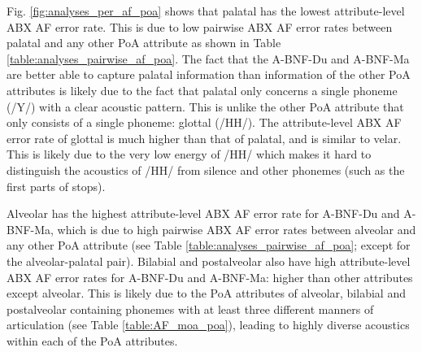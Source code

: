 \documentclass[transmag]{IEEEtran}
\begin{document}
Fig. \ref{fig:analyses_per_af_poa} shows that palatal has the lowest attribute-level ABX AF error rate. This is due to low pairwise ABX AF error rates between palatal and any other PoA attribute as shown in Table   \ref{table:analyses_pairwise_af_poa}. The fact that the A-BNF-Du and A-BNF-Ma are better able to capture palatal information than information of the other PoA attributes is likely due to the fact that palatal only concerns a single phoneme (/Y/) with a clear acoustic pattern. This is unlike the other PoA attribute that only consists of a single phoneme: glottal (/HH/). The attribute-level ABX AF error rate of glottal is much higher than that of palatal, and is similar to velar. This is likely due to the very low energy of /HH/ which makes it hard to distinguish the acoustics of /HH/ from silence and other phonemes (such as the first parts of stops).




Alveolar has the highest attribute-level ABX AF error rate for A-BNF-Du and A-BNF-Ma, which is due to high pairwise ABX AF error rates between alveolar and any other PoA attribute (see Table
 \ref{table:analyses_pairwise_af_poa}; except for the alveolar-palatal pair). Bilabial and postalveolar also have high attribute-level ABX AF error rates for A-BNF-Du and A-BNF-Ma: higher  than other attributes except alveolar. This is likely due to the PoA attributes of alveolar, bilabial and postalveolar containing phonemes with at least three different manners of articulation (see
 Table \ref{table:AF_moa_poa}), leading to highly diverse acoustics within each of the PoA attributes.
 
 
\end{document}
